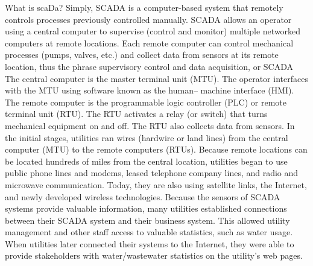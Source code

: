 \documentclass{article}
\begin{document}
What is scaDa? Simply, SCADA is a computer-based system that remotely
controls processes previously controlled manually. SCADA allows an
operator using a central computer to supervise (control and monitor)
multiple networked computers at remote locations. Each remote computer
can control mechanical processes (pumps, valves, etc.) and collect data
from sensors at its remote location, thus the phrase supervisory control
and data acquisition, or SCADA The central computer is the master
terminal unit (MTU). The operator interfaces with the MTU using software
known as the human-- machine interface (HMI). The remote computer is the
programmable logic controller (PLC) or remote terminal unit (RTU). The
RTU activates a relay (or switch) that turns mechanical equipment on and
off. The RTU also collects data from sensors. In the initial stages,
utilities ran wires (hardwire or land lines) from the central computer
(MTU) to the remote computers (RTUs). Because remote locations can be
located hundreds of miles from the central location, utilities began to
use public phone lines and modems, leased telephone company lines, and
radio and microwave communication. Today, they are also using satellite
links, the Internet, and newly developed wireless technologies. Because
the sensors of SCADA systems provide valuable information, many
utilities established connections between their SCADA system and their
business system. This allowed utility management and other staff access
to valuable statistics, such as water usage. When utilities later
connected their systems to the Internet, they were able to provide
stakeholders with water/wastewater statistics on the utility's web
pages.
\end{document}
